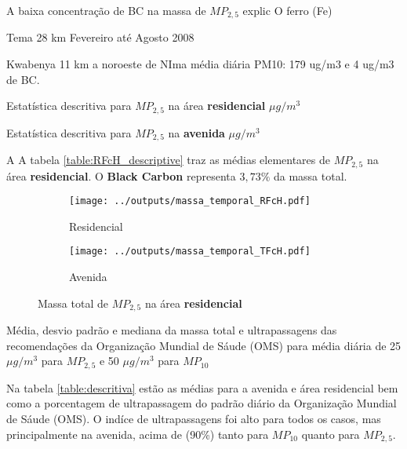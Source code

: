 A baixa concentração de BC na massa de $MP_{2,5}$ explic  O ferro (Fe) 



\citep{ofosu2012} Tema 28 km Fevereiro até Agosto 2008

\citep{aboh2009}  Kwabenya 11 km a noroeste de NIma
média diária PM10: 179 ug/m3 e 4 ug/m3 de BC.



\begin{table}[H]
  \centering
    
  \caption{Estatística descritiva para $MP_{2,5}$ na área \textbf{residencial}
           $\mu g / m^3$ \label{table:RFcH_descriptive}}
\end{table}

\begin{table}[H]
  \centering
    
  \caption{Estatística descritiva para $MP_{2,5}$ na \textbf{avenida}
           $\mu g / m^3$ \label{table:TFcH_descriptive}}
\end{table}

A 
A tabela \ref{table:RFcH_descriptive} traz as médias elementares de $MP_{2,5}$ na área 
\textbf{residencial}.
O \textbf{Black Carbon} representa $3,73 \%$ da massa total.


\begin{figure}[H]
  \centering
  \begin{subfigure}[b]{0.45\textwidth}
    \texttt{[image: ../outputs/massa\_temporal\_RFcH.pdf]}
    \caption{Residencial}
  \end{subfigure}%
  \begin{subfigure}[b]{0.45\textwidth}
    \texttt{[image: ../outputs/massa\_temporal\_TFcH.pdf]}
    \caption{Avenida}
  \end{subfigure}
  \caption{Massa total de $MP_{2,5}$ na área \textbf{residencial} \label{fig:massa_temporal_fino}}
\end{figure}


Média, desvio padrão e mediana da massa total e ultrapassagens das 
           recomendações da Organização Mundial de Sáude (OMS) para média diária de 
           25 $\mu g/m^3$ para $MP_{2,5}$ e 50 $\mu g/m^3$ para $MP_{10}$


Na tabela \ref{table:descritiva} estão as médias para a avenida e área residencial
bem como a porcentagem de ultrapassagem do padrão diário da 
Organização Mundial de Sáude (OMS).
O indíce de ultrapassagens foi alto para todos os casos, mas principalmente na avenida,
acima de (90\%) tanto para $MP_{10}$ quanto para $MP_{2,5}$.

